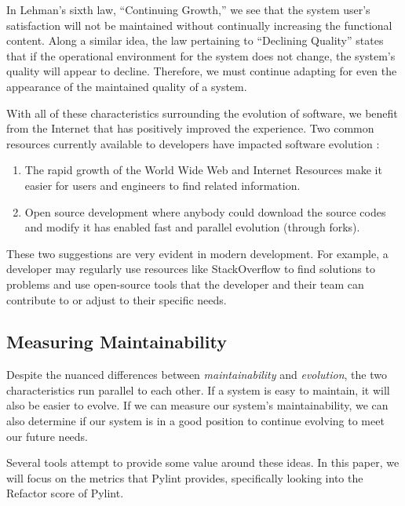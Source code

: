 \documentclass[12pt,conference]{IEEEtran}
\begin{document}
In Lehman's sixth law, ``Continuing Growth,'' we see that the system user's satisfaction will not be maintained without continually increasing the functional content. Along a similar idea, the law pertaining to ``Declining Quality'' states that if the operational environment for the system does not change, the system's quality will appear to decline. Therefore, we must continue adapting for even the appearance of the maintained quality of a system.

With all of these characteristics surrounding the evolution of software, we benefit from the Internet that has positively improved the experience. Two common resources currently available to developers have impacted software evolution \cite{wiki:software-evolution}:

\vspace{0.25cm}
\begin{enumerate}
    \item The rapid growth of the World Wide Web and Internet Resources make it easier for users and engineers to find related information.
    \item Open source development where anybody could download the source codes and modify it has enabled fast and parallel evolution (through forks).
\end{enumerate}
\vspace{0.25cm}

These two suggestions are very evident in modern development. For example, a developer may regularly use resources like StackOverflow to find solutions to problems and use open-source tools that the developer and their team can contribute to or adjust to their specific needs.

\vspace{0.25cm}
\subsection{Measuring Maintainability}

Despite the nuanced differences between \textit{maintainability} and \textit{evolution}, the two characteristics run parallel to each other. If a system is easy to maintain, it will also be easier to evolve. If we can measure our system's maintainability, we can also determine if our system is in a good position to continue evolving to meet our future needs.

Several tools attempt to provide some value around these ideas. In this paper, we will focus on the metrics that Pylint provides, specifically looking into the Refactor score of Pylint.
\end{document}
